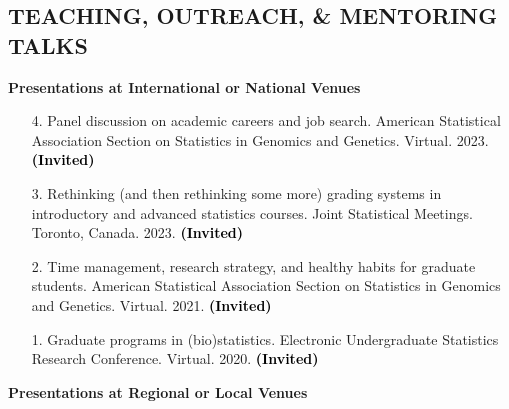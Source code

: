 \documentclass[margin]{res}
\newenvironment{benumerate}[1]{
    \let\oldItem\item
    \def\item{\addtocounter{enumi}{-2}\oldItem}
    
    \begin{enumerate}
    \setcounter{enumi}{#1}
    \addtocounter{enumi}{1}
}{
    \end{enumerate}
}
\newcommand{\annotate}[1]{\textcolor{black}{\textbf{(#1)}}}
\newcommand{\annotateItem}[1]{
	\begin{itemize} \vspace{-0.1cm}
	\item[] 
	\begin{footnotesize}\textcolor{black}{(#1)}\end{footnotesize}
	\end{itemize} \vspace{-0.1cm}
}
\begin{document}
\begin{resume}

\section{TEACHING, OUTREACH, \& MENTORING  TALKS}

\textbf{Presentations at International or National Venues}

\begin{itemize}

\item[4.] Panel discussion on academic careers and job search. 
American Statistical Association Section on Statistics in Genomics and Genetics. Virtual. 2023. 
\annotate{Invited}

\item[3.] Rethinking (and then rethinking some more) grading systems in introductory and advanced statistics courses. 
Joint Statistical Meetings. Toronto, Canada. 2023. 
\annotate{Invited}

\item[2.] Time management, research strategy, and healthy habits for graduate students. 
American Statistical Association Section on Statistics in Genomics and Genetics. Virtual. 2021. 
\annotate{Invited}

\item[1.] Graduate programs in (bio)statistics. 
Electronic Undergraduate Statistics Research Conference. Virtual. 2020. 
\annotate{Invited}

\end{itemize}


\textbf{Presentations at Regional or Local Venues}


\end{resume}
\end{document}
